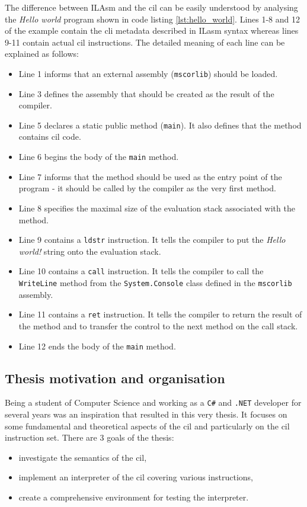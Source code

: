 \documentclass{article}
\numberwithin{equation}{section}
\begin{document}
The difference between ILAsm and the \acrshort{cil} can be easily understood by analysing the \textit{Hello world} program shown in code listing \ref{lst:hello_world}. Lines 1-8 and 12 of the example contain the \acrshort{cli} metadata described in ILasm syntax whereas lines 9-11 contain actual \acrshort{cil} instructions. The detailed meaning of each line can be explained as follows:
\begin{itemize}
	\item{Line 1 informs that an external assembly (\texttt{mscorlib}) should be loaded.}
	\item{Line 3 defines the assembly that should be created as the result of the compiler.}
	\item{Line 5 declares a static public method (\texttt{main}). It also defines that the method contains \acrshort{cil} code.}
	\item{Line 6 begins the body of the \texttt{main} method.}
	\item{Line 7 informs that the method should be used as the entry point of the program - it should be called by the compiler as the very first method.}
	\item{Line 8 specifies the maximal size of the evaluation stack associated with the method.}
	\item{Line 9 contains a \texttt{ldstr} instruction. It tells the compiler to put the \textit{Hello world!} string onto the evaluation stack.}
	\item{Line 10 contains a \texttt{call} instruction. It tells the compiler to call the \texttt{WriteLine} method from the \texttt{System.Console} class defined in the \texttt{mscorlib} assembly.}
	\item{Line 11 contains a \texttt{ret} instruction. It tells the compiler to return the result of the method and to transfer the control to the next method on the call stack.}
	\item{Line 12 ends the body of the \texttt{main} method.}
\end{itemize}

\subsection{Thesis motivation and organisation}

Being a student of Computer Science and working as a \texttt{C\#} and \texttt{.NET} developer for several years was an inspiration that resulted in this very thesis. It focuses on some fundamental and theoretical aspects of the \acrshort{cil} and particularly on the \acrshort{cil} instruction set. There are 3 goals of the thesis:
\begin{itemize}
	\item{investigate the semantics of the \acrshort{cil},}
	\item{implement an interpreter of the \acrshort{cil} covering various instructions,}
	\item{create a comprehensive environment for testing the interpreter.}
\end{itemize}
\end{document}
